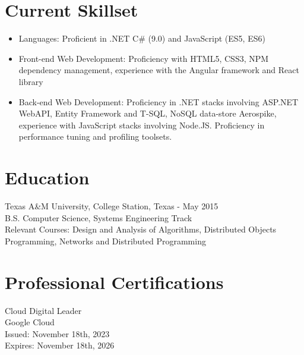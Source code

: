 \documentclass[11pt]{res} %
\begin{document}
\begin{resume}
\section{Current Skillset} 
 
   \begin{itemize} \itemsep -2pt  %
   \item Languages: Proficient in .NET C\# (9.0) and JavaScript (ES5, ES6)
\\
   \item Front-end Web Development: Proficiency with HTML5, CSS3, NPM dependency management, experience with the Angular framework and React library
\\
    \item Back-end Web Development: Proficiency in .NET stacks involving ASP.NET WebAPI, Entity Framework and T-SQL, NoSQL data-store Aerospike, experience with JavaScript stacks involving Node.JS. Proficiency in performance tuning and profiling toolsets.
 \end{itemize}
 
\section{Education} 
 \noindent Texas A\&M University, College Station, Texas - May 2015 \\
B.S. Computer Science, Systems Engineering Track \\
Relevant Courses: Design and Analysis of Algorithms, Distributed Objects Programming, Networks and Distributed Programming
 
\section{Professional Certifications} 
 \noindent Cloud Digital Leader \\
Google Cloud \\
Issued: November 18th, 2023 \\
Expires: November 18th, 2026

\end{resume}
\end{document}
